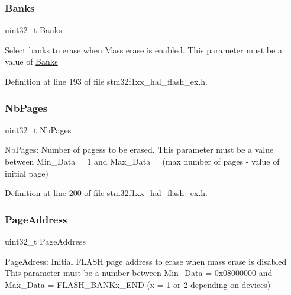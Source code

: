 \subsubsection{\texorpdfstring{Banks}{Banks}}
{\footnotesize\ttfamily uint32\+\_\+t Banks}

Select banks to erase when Mass erase is enabled. This parameter must be a value of \hyperlink{group___f_l_a_s_h_ex___banks}{Banks} 

Definition at line 193 of file stm32f1xx\+\_\+hal\+\_\+flash\+\_\+ex.\+h.

\mbox{\label{struct_f_l_a_s_h___erase_init_type_def_a883b193a78c63e993f1d70102eac64b3}} 
\subsubsection{\texorpdfstring{Nb\+Pages}{NbPages}}
{\footnotesize\ttfamily uint32\+\_\+t Nb\+Pages}

Nb\+Pages\+: Number of pagess to be erased. This parameter must be a value between Min\+\_\+\+Data = 1 and Max\+\_\+\+Data = (max number of pages -\/ value of initial page) 

Definition at line 200 of file stm32f1xx\+\_\+hal\+\_\+flash\+\_\+ex.\+h.

\mbox{\label{struct_f_l_a_s_h___erase_init_type_def_ac0d6c69c326b962d7748bf477c235b00}} 
\subsubsection{\texorpdfstring{Page\+Address}{PageAddress}}
{\footnotesize\ttfamily uint32\+\_\+t Page\+Address}

Page\+Adress\+: Initial F\+L\+A\+SH page address to erase when mass erase is disabled This parameter must be a number between Min\+\_\+\+Data = 0x08000000 and Max\+\_\+\+Data = F\+L\+A\+S\+H\+\_\+\+B\+A\+N\+Kx\+\_\+\+E\+ND (x = 1 or 2 depending on devices) 

